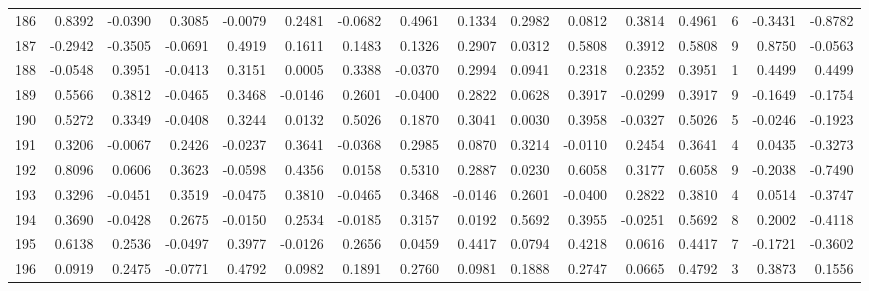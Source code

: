 \begin{tabular}{lrrrrrrrrrrrrrrr}
186 &      0.8392 & -0.0390 &  0.3085 & -0.0079 &  0.2481 & -0.0682 &  0.4961 &  0.1334 &  0.2982 &  0.0812 &   0.3814 &     0.4961 &      6 &                   -0.3431 &                    -0.8782 \\
187 &     -0.2942 & -0.3505 & -0.0691 &  0.4919 &  0.1611 &  0.1483 &  0.1326 &  0.2907 &  0.0312 &  0.5808 &   0.3912 &     0.5808 &      9 &                    0.8750 &                    -0.0563 \\
188 &     -0.0548 &  0.3951 & -0.0413 &  0.3151 &  0.0005 &  0.3388 & -0.0370 &  0.2994 &  0.0941 &  0.2318 &   0.2352 &     0.3951 &      1 &                    0.4499 &                     0.4499 \\
189 &      0.5566 &  0.3812 & -0.0465 &  0.3468 & -0.0146 &  0.2601 & -0.0400 &  0.2822 &  0.0628 &  0.3917 &  -0.0299 &     0.3917 &      9 &                   -0.1649 &                    -0.1754 \\
190 &      0.5272 &  0.3349 & -0.0408 &  0.3244 &  0.0132 &  0.5026 &  0.1870 &  0.3041 &  0.0030 &  0.3958 &  -0.0327 &     0.5026 &      5 &                   -0.0246 &                    -0.1923 \\
191 &      0.3206 & -0.0067 &  0.2426 & -0.0237 &  0.3641 & -0.0368 &  0.2985 &  0.0870 &  0.3214 & -0.0110 &   0.2454 &     0.3641 &      4 &                    0.0435 &                    -0.3273 \\
192 &      0.8096 &  0.0606 &  0.3623 & -0.0598 &  0.4356 &  0.0158 &  0.5310 &  0.2887 &  0.0230 &  0.6058 &   0.3177 &     0.6058 &      9 &                   -0.2038 &                    -0.7490 \\
193 &      0.3296 & -0.0451 &  0.3519 & -0.0475 &  0.3810 & -0.0465 &  0.3468 & -0.0146 &  0.2601 & -0.0400 &   0.2822 &     0.3810 &      4 &                    0.0514 &                    -0.3747 \\
194 &      0.3690 & -0.0428 &  0.2675 & -0.0150 &  0.2534 & -0.0185 &  0.3157 &  0.0192 &  0.5692 &  0.3955 &  -0.0251 &     0.5692 &      8 &                    0.2002 &                    -0.4118 \\
195 &      0.6138 &  0.2536 & -0.0497 &  0.3977 & -0.0126 &  0.2656 &  0.0459 &  0.4417 &  0.0794 &  0.4218 &   0.0616 &     0.4417 &      7 &                   -0.1721 &                    -0.3602 \\
196 &      0.0919 &  0.2475 & -0.0771 &  0.4792 &  0.0982 &  0.1891 &  0.2760 &  0.0981 &  0.1888 &  0.2747 &   0.0665 &     0.4792 &      3 &                    0.3873 &                     0.1556 \\

\end{tabular}
